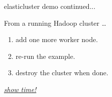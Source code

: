 \documentclass[english,serif,mathserif,usenames,dvipsnames]{beamer}
\begin{document}



\begin{frame}
  {elasticluster demo continued... }

  From a running Hadoop cluster \dots
  \begin{enumerate}
  \item add one more worker node.
  \item re-run the example.
  \item destroy the cluster when done.
  \end{enumerate}
  \pause
  \begin{center}
    \href{http://youtu.be/-Z4FaXEivVo\#t=2m12s}{\textit{show time!}}
  \end{center}
\end{frame}
\end{document}
